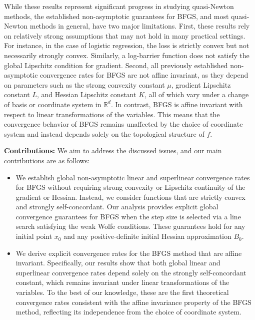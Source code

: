 \documentclass[11pt,letterpaper]{article}
\newcommand\0{{\Vector{0}}}
\newcommand\1{{\Vector{1}}}
\numberwithin{assumption}{section}
\numberwithin{definition}{section}
\numberwithin{theorem}{section}
\numberwithin{remark}{section}
\begin{document}
While these results represent significant progress in studying quasi-Newton methods, the established non-asymptotic guarantees for BFGS, and most quasi-Newton methods in general, have two major limitations. First, these results rely on relatively strong assumptions that may not hold in many practical settings. For instance, in the case of logistic regression, the loss is strictly convex but not necessarily strongly convex. Similarly, a log-barrier function does not satisfy the global Lipschitz condition for gradient. Second, all previously established non-asymptotic convergence rates for BFGS are not affine invariant, as they depend on parameters such as the strong convexity constant \(\mu\), gradient Lipschitz constant \(L\), and Hessian Lipschitz constant \(K\), all of which vary under a change of basis or coordinate system in \(\mathbb{R}^d\). In contrast, BFGS is affine invariant with respect to linear transformations of the variables. This means that the convergence behavior of BFGS remains unaffected by the choice of coordinate system and instead depends solely on the topological structure of  \(f\). 

\noindent\textbf{Contributions:} We aim to address the discussed issues, and our main contributions are as follows:
\begin{itemize}

\item 
    We establish global non-asymptotic linear and superlinear convergence rates for BFGS without requiring strong convexity or Lipschitz continuity of the gradient or Hessian. Instead, we consider functions that are strictly convex and strongly self-concordant. Our analysis provides explicit global convergence guarantees for BFGS when the step size is selected via a line search satisfying the weak Wolfe conditions. These guarantees hold for any initial point \(x_0\) and any positive-definite initial Hessian approximation \(B_0\). %

\item 
   We derive explicit convergence rates for the BFGS  method that are affine invariant. Specifically, our results show that both global linear and superlinear convergence rates depend solely on the strongly self-concordant constant, which remains invariant under linear transformations of the variables. To the best of our knowledge, these are the first theoretical convergence rates consistent with the affine invariance property of the BFGS method, reflecting its independence from the choice of coordinate system. 

\end{itemize}
\end{document}
